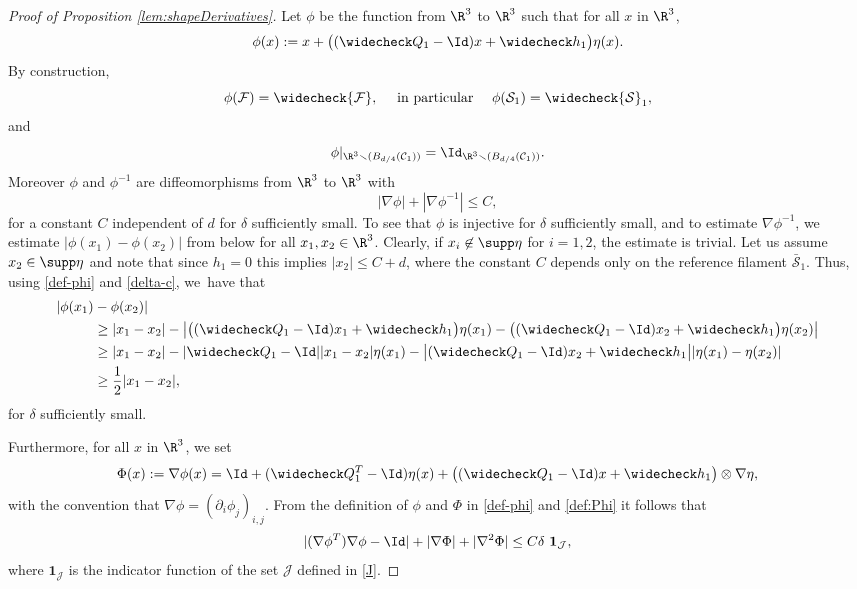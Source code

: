 \begin{proof}[Proof of Proposition \ref{lem:shapeDerivatives}]
Let $\phi$ be the function from $\R^3$ to $\R^3$ such that for all $x$ in $\R^3$,
\begin{equation} \label{def-phi}
\phi(x) := x + \bigl((\widecheck Q_1 - \Id)x + \widecheck h_1 \bigr) \eta(x).
\end{equation}
By construction,
\begin{equation} \label{dodomain}
\phi(\mathcal F) = \widecheck {\mathcal F}, \quad \text{ in particular } \quad
\phi(\mathcal S_1) = \widecheck {\mathcal S}_1,
\end{equation}
and
\begin{equation} \label{elaid}
\phi \vert_{\R^3 \smallsetminus (B_{d/4}(\mathcal C_1))} = \Id_{\R^3 \smallsetminus (B_{d/4}(\mathcal C_1))}.
\end{equation}
Moreover $\phi$ and $\phi^{-1}$ are diffeomorphisms from $\R^3$ to $\R^3$
with
\begin{equation}
\label{pourcp}
|\nabla \phi| + |\nabla \phi^{-1}| \leq C,
\end{equation}
for a constant $C$ independent of $d$ for $\delta$ sufficiently small.
To see that $\phi$ is injective for $\delta$ sufficiently small, and to estimate $\nabla \phi^{-1}$, we estimate $|\phi(x_1) - \phi(x_2)|$ from below for all $x_1,x_2 \in \R^3$. Clearly, if $x_i \not \in \supp \eta$ for $i = 1,2$, the estimate is trivial.
Let us assume $x_2 \in \supp \eta$ and note that since $h_1 = 0$ this implies $|x_2| \leq C + d$,
where the constant $C$ depends only on the reference filament $\bar{\mathcal S}_1$.
Thus, using \eqref{def-phi} and \eqref{delta-c}, we~have that
\begin{align*}
|\phi(x_1) &- \phi(x_2)| \\
&\geq |x_1 - x_2| - \big|\big((\widecheck Q_1 - \Id)x_1 + \widecheck h_1 \big) \eta(x_1) - \big((\widecheck Q_1 - \Id)x_2 + \widecheck h_1 \big) \eta(x_2)\big| \\
& \geq |x_1 - x_2| - |\widecheck Q_1 - \Id||x_1 - x_2| \eta(x_1) - \big|(\widecheck Q_1 - \Id)x_2 + \widecheck h_1 \big||\eta(x_1) - \eta(x_2)| \\
& \geq \frac 1 2 |x_1 - x_2|,
\end{align*}
for $\delta$ sufficiently small.

Furthermore, for all $x$ in $\R^3$, we set
\begin{equation} \label{def:Phi}
\Phi(x) := {\nabla\phi(x)} = \Id + (\widecheck Q_1^T - \Id) \eta(x) +
\bigl((\widecheck Q_1 - \Id)x + \widecheck h_1 \bigr) \otimes \nabla \eta,
\end{equation}
with the convention that $\nabla\phi = (\partial_i \phi_j)_{i,j}$.
From the definition of $\phi$ and $\Phi$ in \eqref{def-phi} and \eqref{def:Phi}
it follows that
\begin{equation} \label{esti-mir}
|(\nabla \phi^T) \nabla \phi - \Id|+
|\nabla \Phi|+ |\nabla^2 \Phi| \leq C \delta \ \mathbf{1}_{\mathcal J},
\end{equation}
where $ \mathbf{1}_\mathcal{J}$ is the indicator function of the set $\mathcal{J}$ defined in \eqref{J}.


\end{proof}
